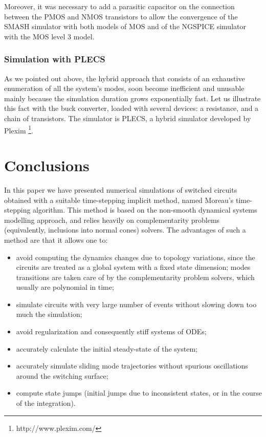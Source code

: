 Moreover, it was necessary to add a parasitic capacitor on the connection between the PMOS and NMOS
transistors to allow the convergence of the SMASH simulator with both models of MOS
and of the NGSPICE simulator with the MOS level 3 model.


\subsubsection{Simulation with PLECS}

As we pointed out above, the hybrid approach that consists of an exhaustive enumeration of all the system's modes, soon become inefficient and unusable mainly because the simulation duration grows exponentially fast. Let us illustrate this fact with the buck converter, loaded with several devices: a resistance, and a chain of transistors. The simulator is PLECS, a hybrid simulator developed by Plexim \footnote{http://www.plexim.com/}. 




\section{Conclusions}
\label{section5}


In this paper we have presented numerical simulations of switched circuits obtained with a suitable time-stepping implicit method, named Moreau's time-stepping algorithm. This method is based on the non-smooth dynamical systems modelling approach, and relies heavily on complementarity problems (equivalently, inclusions into normal cones) solvers. The advantages of such a method are that it allows one to:

\begin{itemize}

\item avoid computing the dynamics changes due to topology variations, since the circuits are treated as a global system with a fixed state dimension; modes transitions are taken care of by the complementarity problem solvers, which usually are polynomial in time;

\item simulate circuits with very large number of events without slowing down too much the simulation;

\item avoid regularization and consequently stiff systems of ODEs;

\item accurately calculate the initial steady-state of the system;

\item accurately simulate sliding mode trajectories without spurious oscillations around the switching surface;

\item compute state jumps (initial jumps due to inconsistent states, or in the course of the integration). 

\end{itemize}


